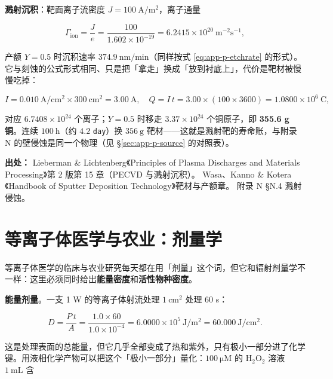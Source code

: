 \textbf{溅射沉积}：靶面离子流密度 $J=100\ \mathrm{A/m^2}$，离子通量

\begin{equation}
  \Gamma_{\mathrm{ion}} = \frac{J}{e} = \frac{100}{1.602\times10^{-19}} = 6.2415\times10^{20}\ \mathrm{m^{-2}s^{-1}},
  \label{eq:app-p-sputflux}
\end{equation}

产额 $Y=0.5$ 时沉积速率 $374.9\ \mathrm{nm/min}$（同样按式 \eqref{eq:app-p-etchrate} 的形式）。它与刻蚀的公式形式相同、只是把「拿走」换成「放到衬底上」，代价是靶材被慢慢吃掉：

\begin{equation}
  I = 0.010\ \mathrm{A/cm^2}\times300\ \mathrm{cm^2} = 3.00\ \mathrm{A},
  \quad
  Q = I\,t = 3.00\times(100\times3600) = 1.0800\times10^{6}\ \mathrm{C},
  \label{eq:app-p-targetq}
\end{equation}

对应 $6.7408\times10^{24}$ 个离子；$Y=0.5$ 时移走 $3.37\times10^{24}$ 个铜原子，即 \textbf{355.6 g 铜}。连续 $100\ \mathrm{h}$（约 $4.2$ \texttt{day}）换 $356\ \mathrm{g}$ 靶材——这就是溅射靶的寿命账，与附录 N 的壁侵蚀是同一个物理（见 §\ref{sec:app-p-source} 的对照表）。

{\footnotesize
\textbf{出处：} Lieberman \& Lichtenberg《Principles of Plasma Discharges and Materials Processing》第 2 版第 15 章（PECVD 与溅射沉积）。
Wasa、Kanno \& Kotera《Handbook of Sputter Deposition Technology》靶材与产额章。
附录 N §N.4 溅射侵蚀。
}

\section{等离子体医学与农业：剂量学}
\label{sec:app-p-medicine}

等离子体医学的临床与农业研究每天都在用「剂量」这个词，但它和辐射剂量学不一样：这里必须同时给出\textbf{能量密度}和\textbf{活性物种密度}。

\textbf{能量剂量}。一支 1 W 的等离子体射流处理 $1\ \mathrm{cm^2}$ 处理 60 s：

\begin{equation}
  D = \frac{P\,t}{A} = \frac{1.0\times60}{1.0\times10^{-4}} = 6.0000\times10^{5}\ \mathrm{J/m^2} = 60.000\ \mathrm{J/cm^2}.
  \label{eq:app-p-dose}
\end{equation}

这是处理表面的总能量，但它几乎全部变成了热和紫外，只有极小一部分进了化学键。用液相化学产物可以把这个「极小一部分」量化：$100\ \mathrm{\mu M}$ 的 $\mathrm{H_2O_2}$ 溶液 $1\ \mathrm{mL}$ 含

